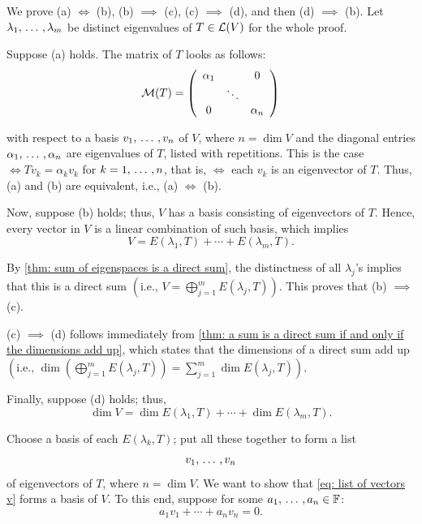 \begin{prf} We prove (a) $\iff$ (b), (b) $\implies$ (c), (c) $\implies$ (d), and then (d) $\implies$ (b). Let $\lambda_1, {\, \ldots \,\,}, \lambda_m$ be distinct eigenvalues of $T \in \mathcal{L} (V)$ for the whole proof.

  \StepOne Suppose (a) holds. The matrix of $T$ looks as follows:
  \begin{equation}
    \mathcal{M}(T) =
    \left( {\begin{array}{ccc}
        \alpha_1 &         & 0 \\
        &  \ddots &    \\
        0      &         & \alpha_n
    \end{array} } \right)
  \end{equation}

  with respect to a basis $v_1, {\, \ldots \,\,}, v_n$ of $V$, where $n = \dim V$ and the diagonal entries $\alpha_1, {\, \ldots \,\,}, \alpha_n$ are eigenvalues of $T$, listed with repetitions. This is the case $\iff Tv_k = \alpha_k v_k$ for $k = 1, {\, \ldots \,\,}, n$, that is, $\iff$ each $v_k$ is an eigenvector of $T$. Thus, (a) and (b) are equivalent, i.e., (a) $\iff$ (b).

  \StepTwo Now, suppose (b) holds; thus, $V$ has a basis consisting of eigenvectors of $T$. Hence, every vector in $V$ is a linear combination of such basis, which implies
  \begin{equation}
    V = E(\lambda_1, T) + \cdots + E(\lambda_m, T).
  \end{equation}

  By \ref{thm: sum of eigenspaces is a direct sum}, the distinctness of all $\lambda_j$'s implies that this is a direct sum $\left(\text{i.e., } V=\bigoplus_{j=1}^{m}  E(\lambda_j, T) \right)$. This proves that (b) $\implies$ (c).

  \StepThree (c) $\implies$ (d) follows immediately from \ref{thm: a sum is a direct sum if and only if the dimensions add up}, which states that the dimensions of a direct sum add up $\left(\text{i.e., } \dim \left(\bigoplus_{j=1}^m E(\lambda_j, T)\right) = \sum_{j=1}^{m} \dim E(\lambda_j, T) \right)$.

  \StepFour Finally, suppose (d) holds; thus,
  \begin{equation}
    \dim V = \dim E(\lambda_1, T) + \cdots + \dim E(\lambda_m, T).
  \end{equation}

  Choose a basis of each $E(\lambda_k, T)$; put all these together to form a list
  \begin{equation}
    \label{eq: list of vectors v}
    v_1, {\, \ldots \,\,}, v_n
  \end{equation}
  of eigenvectors of $T$, where $n = \dim V$. We want to show that \eqref{eq: list of vectors v} forms a basis of $V$. To this end, suppose for some $a_1, {\, \ldots \,\,}, a_n \in \mathbb{F}$:
  \begin{equation}
    \label{eq: sum of vs}
    a_1 v_1 + \cdots + a_n v_n = 0.
  \end{equation}


\end{prf}
